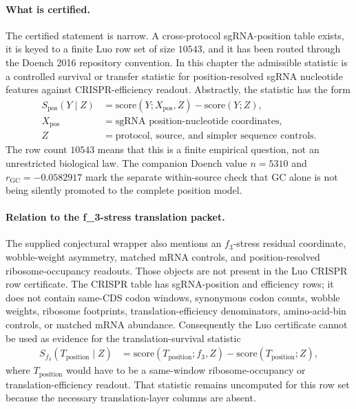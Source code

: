 \paragraph{What is certified.}
The certified statement is narrow.  A cross-protocol sgRNA-position table exists, it is keyed to a finite Luo row set of size $10543$, and it has been routed through the Doench 2016 repository convention.  In this chapter the admissible statistic is a controlled survival or transfer statistic for position-resolved sgRNA nucleotide features against CRISPR-efficiency readout.  Abstractly, the statistic has the form
$$
\begin{aligned}
  S_{\mathrm{pos}}(Y \mid Z)
    &= \mathrm{score}(Y; X_{\mathrm{pos}}, Z)
       - \mathrm{score}(Y; Z),\\
  X_{\mathrm{pos}} &= \text{sgRNA position-nucleotide coordinates},\\
  Z &= \text{protocol, source, and simpler sequence controls}.
\end{aligned}
$$
The row count $10543$ means that this is a finite empirical question, not an unrestricted biological law.  The companion Doench value $n=5310$ and $r_{\mathrm{GC}}=-0.0582917$ mark the separate within-source check that GC alone is not being silently promoted to the complete position model.

\paragraph{Relation to the f\_3-stress translation packet.}
The supplied conjectural wrapper also mentions an $f_3$-stress residual coordinate, wobble-weight asymmetry, matched mRNA controls, and position-resolved ribosome-occupancy readouts.  Those objects are not present in the Luo CRISPR row certificate.  The CRISPR table has sgRNA-position and efficiency rows; it does not contain same-CDS codon windows, synonymous codon counts, wobble weights, ribosome footprints, translation-efficiency denominators, amino-acid-bin controls, or matched mRNA abundance.  Consequently the Luo certificate cannot be used as evidence for the translation-survival statistic
$$
\begin{aligned}
  S_{f_3}(T_{\mathrm{position}} \mid Z)
    &= \mathrm{score}(T_{\mathrm{position}}; f_3, Z)
       - \mathrm{score}(T_{\mathrm{position}}; Z),
\end{aligned}
$$
where $T_{\mathrm{position}}$ would have to be a same-window ribosome-occupancy or translation-efficiency readout.  That statistic remains uncomputed for this row set because the necessary translation-layer columns are absent.

